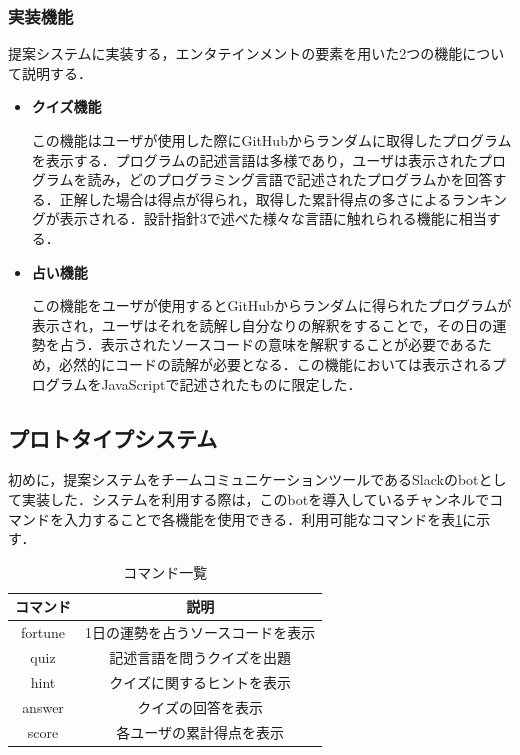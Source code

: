 \subsubsection{実装機能}
提案システムに実装する，エンタテインメントの要素を用いた2つの機能について説明する．
\begin{itemize}
  \item {\bf クイズ機能}

  この機能はユーザが使用した際にGitHubからランダムに取得したプログラムを表示する．プログラムの記述言語は多様であり，ユーザは表示されたプログラムを読み，どのプログラミング言語で記述されたプログラムかを回答する．正解した場合は得点が得られ，取得した累計得点の多さによるランキングが表示される．設計指針3で述べた様々な言語に触れられる機能に相当する．

  \item {\bf 占い機能}

  この機能をユーザが使用するとGitHubからランダムに得られたプログラムが表示され，ユーザはそれを読解し自分なりの解釈をすることで，その日の運勢を占う．表示されたソースコードの意味を解釈することが必要であるため，必然的にコードの読解が必要となる．この機能においては表示されるプログラムをJavaScriptで記述されたものに限定した．

\end{itemize}

\subsection{プロトタイプシステム}
初めに，提案システムをチームコミュニケーションツールであるSlackのbotとして実装した．システムを利用する際は，このbotを導入しているチャンネルでコマンドを入力することで各機能を使用できる．利用可能なコマンドを表\ref{function}に示す．

\begin{table}[!ht]
  \centering
    \caption{コマンド一覧}
      \begin{tabular}{|c|c|} \hline
        コマンド & 説明 \\ \hline \hline
        fortune & 1日の運勢を占うソースコードを表示 \\ \hline
        quiz & 記述言語を問うクイズを出題 \\ \hline
        hint & クイズに関するヒントを表示 \\ \hline
        answer & クイズの回答を表示 \\ \hline
        score & 各ユーザの累計得点を表示 \\ \hline
      \end{tabular}
    \label{function}
  \end{table}

